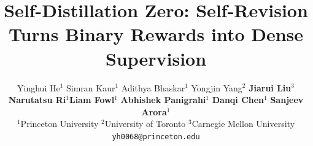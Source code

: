 \documentclass{article} %
\title{Self-Distillation Zero: Self-Revision Turns Binary Rewards into Dense Supervision}
\author{Yinghui He$^1$ \quad Simran Kaur$^1$ \quad Adithya Bhaskar$^1$ \quad Yongjin Yang$^2$ \quad
 \textbf{Jiarui Liu}$^3$ \\ \textbf{Narutatsu Ri}$^1$\quad \textbf{Liam Fowl}$^1$ \quad \textbf{Abhishek Panigrahi}$^1$ \quad \textbf{Danqi Chen}$^1$ \quad \textbf{Sanjeev Arora}$^1$   \\
$^1$Princeton University \quad
$^2$University of Toronto \quad
$^3$Carnegie Mellon University\\
\texttt{yh0068@princeton.edu} \\
}
\begin{document}

\ifcolmsubmission
\linenumbers    
\fi

\maketitle







%
%




% 
% 





\newpage
\appendix


\clearpage


\clearpage

\clearpage

\clearpage

\clearpage

\clearpage

\clearpage

\end{document}
